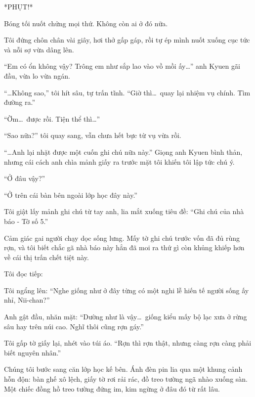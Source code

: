 \documentclass[../main.tex]{subfiles}
\begin{document}
*PHỤT!*

Bóng tối nuốt chửng mọi thứ. Không còn ai ở đó nữa.

Tôi đứng chôn chân vài giây, hơi thở gấp gáp, rồi tự ép mình nuốt xuống cục tức và nỗi sợ vừa dâng lên.

``Em có ổn không vậy? Trông em như sắp lao vào vồ mồi ấy\dots'' anh Kyuen gãi đầu, vừa lo vừa ngán.

``\dots Không sao,'' tôi hít sâu, tự trấn tĩnh. ``Giờ thì\dots\ quay lại nhiệm vụ chính. Tìm đường ra.''

``Ờm\dots\ được rồi. Tiện thể thì\dots''

``Sao nữa?'' tôi quay sang, vẫn chưa hết bực từ vụ vừa rồi.

``\dots Anh lại nhặt được một cuốn ghi chú nữa này.'' Giọng anh Kyuen bình thản, nhưng cái cách anh chìa mảnh giấy ra trước mặt tôi khiến tôi lập tức chú ý.

``Ở đâu vậy?''

``Ở trên cái bàn bên ngoài lớp học đây này.''

Tôi giật lấy mảnh ghi chú từ tay anh, lia mắt xuống tiêu đề: ``{\vnmsans Ghi chú của nhà báo - Tờ số 5.}''

Cảm giác gai người chạy dọc sống lưng. Mấy tờ ghi chú trước vốn đã đủ rùng rợn, và tôi biết chắc gã nhà báo này hẳn đã moi ra thứ gì còn khủng khiếp hơn về cái thị trấn chết tiệt này.

Tôi đọc tiếp:


Tôi ngẩng lên: ``Nghe giống như ở đây từng có một nghi lễ hiến tế người sống ấy nhỉ, Nii-chan?''

Anh gật đầu, nhăn mặt: ``Dường như là vậy\dots\ giống kiểu mấy bộ lạc xưa ở rừng sâu hay trên núi cao. Nghĩ thôi cũng rợn gáy.''

Tôi gấp tờ giấy lại, nhét vào túi áo. ``Rợn thì rợn thật, nhưng càng rợn càng phải biết nguyên nhân.''

\ct

Chúng tôi bước sang căn lớp học kế bên. Ánh đèn pin lia qua một khung cảnh hỗn độn: bàn ghế xô lệch, giấy tờ rơi rải rác, đồ treo tường ngã nhào xuống sàn. Một chiếc đồng hồ treo tường đứng im, kim ngừng ở đâu đó từ rất lâu.
\end{document}
